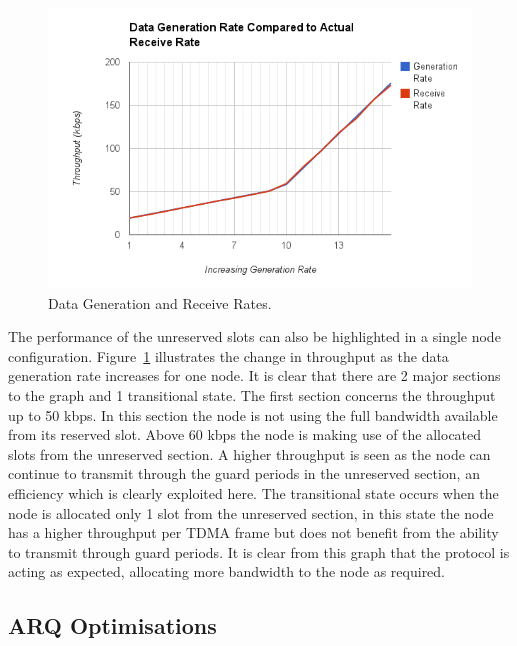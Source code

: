\documentclass[parskip]{cs4rep}
\begin{document}
\begin{figure}
	\centering
	\includegraphics[width=120mm]{generationvsactual.png}
	\caption{Data Generation and Receive Rates.}
	\label{fig:GenerationVsActual}
\end{figure}

The performance of the unreserved slots can also be highlighted in a single node configuration. Figure~\ref{fig:GenerationVsActual} illustrates the change in throughput as the data generation rate increases for one node. It is clear that there are 2 major sections to the graph and 1 transitional state. The first section concerns the throughput up to 50 kbps. In this section the node is not using the full bandwidth available from its reserved slot. Above 60 kbps the node is making use of the allocated slots from the unreserved section. A higher throughput is seen as the node can continue to transmit through the guard periods in the unreserved section, an efficiency which is clearly exploited here. The transitional state occurs when the node is allocated only 1 slot from the unreserved section, in this state the node has a higher throughput per TDMA frame but does not benefit from the ability to transmit through guard periods. It is clear from this graph that the protocol is acting as expected, allocating more bandwidth to the node as required.

\subsection{ARQ Optimisations}
\end{document}
